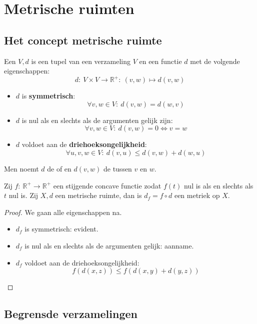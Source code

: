 \documentclass[main.tex]{subfiles}
\begin{document}
\chapter{Metrische ruimten}
\label{cha:metrische-ruimten}

\section{Het concept metrische ruimte}
\label{sec:het-conc-metr}

\begin{de}
  \label{de:metrische-ruimte}
  Een  $V,d$ is een tupel van een verzameling $V$ en een functie $d$ met de volgende eigenschappen:
  \[ d:\ V \times V \rightarrow \mathbb{R}^{+}:\ (v,w) \mapsto d(v,w) \]
  \begin{itemize}
  \item $d$ is \textbf{symmetrisch}:
    \[ \forall v,w \in V:\ d(v,w) = d(w,v) \]
  \item $d$ is nul als en slechts als de argumenten gelijk zijn:
    \[ \forall v,w \in V:\ d(v,w) = 0 \Leftrightarrow v = w \]
  \item $d$ voldoet aan de \textbf{driehoeksongelijkheid}:
    \[ \forall u,v,w \in V:\ d(v,u) \le d(v,w) + d(w,u) \]
  \end{itemize}
  Men noemt $d$ de  of  en $d(v,w)$ de  tussen $v$ en $w$.
\end{de}


\begin{st}
  Zij $f:\ \mathbb{R}^{+} \rightarrow \mathbb{R}^{+}$ een stijgende concave functie zodat $f(t)$ nul is als en slechts als $t$ nul is.
  Zij $X,d$ een metrische ruimte, dan is $d_{f} = f\circ d$ een metriek op $X$.

  \begin{proof}
    We gaan alle eigenschappen na.
    \begin{itemize}
    \item $d_{f}$ is symmetrisch: evident.
    \item $d_{f}$ is nul als en slechts als de argumenten gelijk: aanname.
    \item $d_{f}$ voldoet aan de driehoeksongelijkheid:
      \[ f(d(x,z)) \le f(d(x,y) + d(y,z)) \]
    \end{itemize}
  \end{proof}
\end{st}

\section{Begrensde verzamelingen}
\label{sec:begr-verz}
\end{document}
